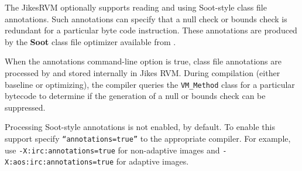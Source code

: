 The Jikes\trademark RVM optionally supports reading and using
Soot-style class file 
annotations.  Such annotations can specify that a null check or bounds
check is redundant for a particular byte code instruction.  These
annotations are produced by the {\bf Soot} class file optimizer
available from
\xlink{\SOOTURL}{\SOOTURL}.  

When the annotations command-line option is true, class file
annotations are processed by  and stored internally in Jikes RVM.
During compilation (either baseline or optimizing), the compiler 
queries the {\tt VM\_Method} class for a particular bytecode to
determine if the generation of a null or bounds check can be
suppressed. 

Processing Soot-style annotations is not enabled, by default.  To
enable this support specify {\tt ``annotations=true''} to the
appropriate compiler.  For example, use {\tt -X:irc:annotations=true}
for non-adaptive images and {\tt -X:aos:irc:annotations=true} for
adaptive images.

\JikesTMFooter
